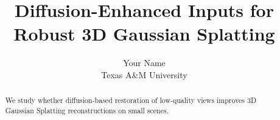 \documentclass[10pt,twocolumn]{article}
\title{Diffusion-Enhanced Inputs for Robust 3D Gaussian Splatting}
\author{Your Name \\ Texas A\&M University}
\begin{document}
\maketitle

\begin{abstract}
We study whether diffusion-based restoration of low-quality views improves 3D Gaussian Splatting reconstructions on small scenes.
\end{abstract}










\end{document}
